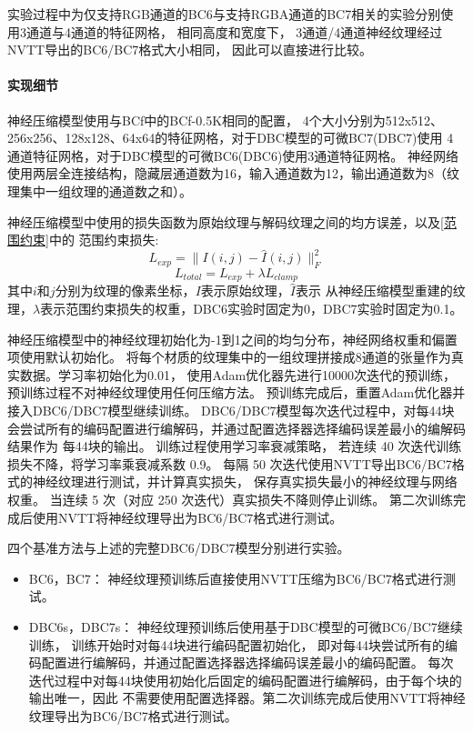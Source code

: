 实验过程中为仅支持RGB通道的BC6与支持RGBA通道的BC7相关的实验分别使用3通道与4通道的特征网格，
相同高度和宽度下，
3通道/4通道神经纹理经过NVTT导出的BC6/BC7格式大小相同，
因此可以直接进行比较。

\paragraph{实现细节}

神经压缩模型使用与BCf\cite{weinreich2024real}中的BCf-0.5K相同的配置，
4个大小分别为512x512、256x256、128x128、64x64的特征网格，对于DBC模型的可微BC7(DBC7)使用
4通道特征网格，对于DBC模型的可微BC6(DBC6)使用3通道特征网格。
神经网络使用两层全连接结构，隐藏层通道数为16，输入通道数为12，输出通道数为8（纹理集中一组纹理的通道数之和）。

神经压缩模型中使用的损失函数为原始纹理与解码纹理之间的均方误差，以及\ref{范围约束}中的
范围约束损失:
\begin{equation}
    L_{exp}=\| I(i,j) - \hat{I}(i,j) \|^2_F
\end{equation}
\begin{equation}
    L_{total}=L_{exp}+\lambda L_{clamp}
\end{equation}
其中$i$和$j$分别为纹理的像素坐标，$I$表示原始纹理，$\hat{I}$表示
从神经压缩模型重建的纹理，$\lambda$表示范围约束损失的权重，DBC6实验时固定为0，DBC7实验时固定为0.1。

神经压缩模型中的神经纹理初始化为-1到1之间的均匀分布，神经网络权重和偏置项使用默认初始化。
将每个材质的纹理集中的一组纹理拼接成8通道的张量作为真实数据。学习率初始化为0.01，
使用Adam优化器先进行10000次迭代的预训练，预训练过程不对神经纹理使用任何压缩方法。
预训练完成后，重置Adam优化器并接入DBC6/DBC7模型继续训练。
DBC6/DBC7模型每次迭代过程中，对每4\times4块会尝试所有的编码配置进行编解码，并通过配置选择器选择编码误差最小的编解码结果作为
每4\times4块的输出。
训练过程使用学习率衰减策略，
若连续 40 次迭代训练损失不降，将学习率乘衰减系数 0.9。
每隔 50 次迭代使用NVTT导出BC6/BC7格式的神经纹理进行测试，并计算真实损失，
保存真实损失最小的神经纹理与网络权重。
当连续 5 次（对应 250 次迭代）真实损失不降则停止训练。
第二次训练完成后使用NVTT将神经纹理导出为BC6/BC7格式进行测试。

四个基准方法与上述的完整DBC6/DBC7模型分别进行实验。

\begin{itemize}
    \item BC6，BC7： 神经纹理预训练后直接使用NVTT压缩为BC6/BC7格式进行测试。
    \item DBC6s，DBC7s： 神经纹理预训练后使用基于DBC模型的可微BC6/BC7继续训练，
    训练开始时对每4\times4块进行编码配置初始化，
    即对每4\times4块尝试所有的编码配置进行编解码，并通过配置选择器选择编码误差最小的编码配置。
    每次迭代过程中对每4\times4块使用初始化后固定的编码配置进行编解码，由于每个块的输出唯一，因此
    不需要使用配置选择器。第二次训练完成后使用NVTT将神经纹理导出为BC6/BC7格式进行测试。
\end{itemize}

